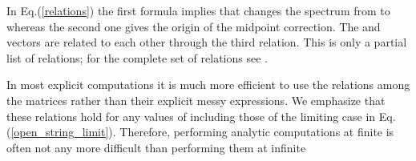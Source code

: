 \documentclass[a4paper,aps,preprint,nofootinbib,eqsecnum]{revtex4}
\begin{document}
In Eq.(\ref{relations}) the first formula implies that \coordHE{} changes
the spectrum from \coordHE{} to \coordHE{} whereas the second one gives the origin of the midpoint
correction. The \coordHE{} and \coordHE{} vectors
are related to each other through the third relation. This is only
a partial list of relations; for the complete set of relations see \cite{BM2}%
.

In most explicit computations it is much more efficient to use the relations
among the matrices rather than their explicit messy expressions. We
emphasize that these relations hold for any values of \coordHE{}
including those of the limiting case in Eq.(\ref{open_string_limit}).
Therefore, performing analytic computations at finite \coordHE{} is often not any
more difficult than performing them at infinite \coordHE{}
\end{document}
